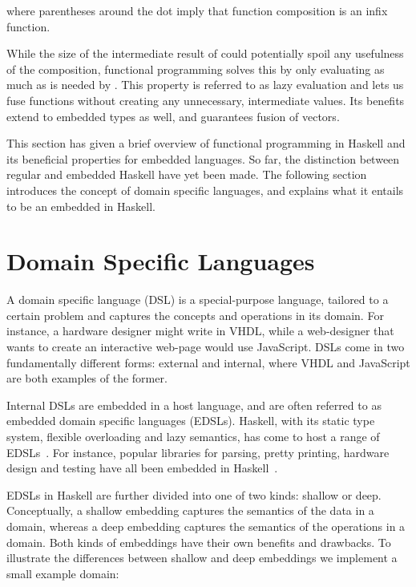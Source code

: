 \documentclass[../paper.tex]{subfiles}
\begin{document}
\noindent where parentheses around the dot imply that function composition is an infix function.

While the size of the intermediate result of  could potentially spoil any usefulness of the composition, functional programming solves this by only evaluating  as much as is needed by . This property is referred to as lazy evaluation and lets us fuse functions without creating any unnecessary, intermediate values. Its benefits extend to embedded types as well, and guarantees fusion of vectors.

This section has given a brief overview of functional programming in Haskell and its beneficial properties for embedded languages. So far, the distinction between regular and embedded Haskell have yet been made. The following section introduces the concept of domain specific languages, and explains what it entails to be an embedded in Haskell. 

\section{Domain Specific Languages}
\label{domain}

A domain specific language (DSL) is a special-purpose language, tailored to a certain problem and captures the concepts and operations in its domain. For instance, a hardware designer might write in VHDL, while a web-designer that wants to create an interactive web-page would use JavaScript. DSLs come in two fundamentally different forms: external and internal, where VHDL and JavaScript are both examples of the former.

Internal DSLs are embedded in a host language, and are often referred to as embedded domain specific languages (EDSLs). Haskell, with its static type system, flexible overloading and lazy semantics, has come to host a range of EDSLs~\cite{elliott2003}. For instance, popular libraries for parsing, pretty printing, hardware design and testing have all been embedded in Haskell~\cite{leijen2002, hughes1995, bjesse1998}.

EDSLs in Haskell are further divided into one of two kinds: shallow or deep. Conceptually, a shallow embedding captures the semantics of the data in a domain, whereas a deep embedding captures the semantics of the operations in a domain. Both kinds of embeddings have their own benefits and drawbacks. To illustrate the differences between shallow and deep embeddings we implement a small example domain:
\end{document}
